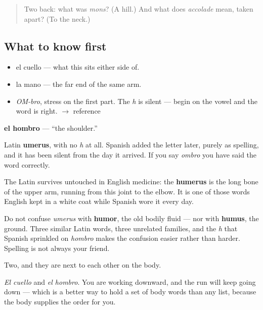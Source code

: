 \label{lesson:ES-C293-hombro}



\begin{quote}
Two back: what was \emph{mons}? (A hill.) And what does \emph{accolade} mean, taken apart? (To the neck.)
\end{quote}

\subsection*{What to know first}
\begin{itemize}
\raggedright
  \item el cuello — what this sits either side of.
  \item la mano — the far end of the same arm.
\end{itemize}

\begin{sounds}
\begin{itemize}
\raggedright
  \item \emph{OM-bro}, stress on the first part. The \emph{h} is silent — begin on the vowel and the word is right. $\to$ reference
\end{itemize}
\end{sounds}

\begin{cousinweb}
\textbf{el hombro} — \textquotedblleft{}the shoulder.\textquotedblright{}

Latin \textbf{umerus}, with no \emph{h} at all. Spanish added the letter later, purely as spelling, and it has been silent from the day it arrived. If you say \emph{ombro} you have said the word correctly.

The Latin survives untouched in English medicine: the \textbf{humerus} is the long bone of the upper arm, running from this joint to the elbow. It is one of those words English kept in a white coat while Spanish wore it every day.

Do not confuse \emph{umerus} with \textbf{humor}, the old bodily fluid — nor with \textbf{humus}, the ground. Three similar Latin words, three unrelated families, and the \emph{h} that Spanish sprinkled on \emph{hombro} makes the confusion easier rather than harder. Spelling is not always your friend.
\end{cousinweb}

\begin{grammarlens}[title={What you've built}]
Two, and they are next to each other on the body.

\emph{El cuello} and \emph{el hombro}. You are working downward, and the run will keep going down — which is a better way to hold a set of body words than any list, because the body supplies the order for you.
\end{grammarlens}

